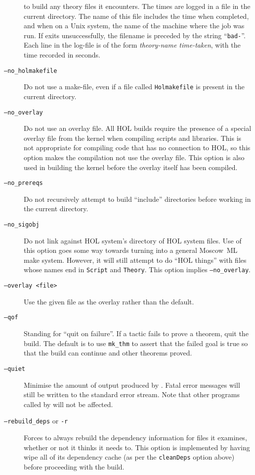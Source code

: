 \begin{description}
  to build any theory files it encounters.  The times are logged in a
  file in the current directory.  The name of this file includes the
  time when \holmake{} completed, and when on a Unix system, the name
  of the machine where the job was run.  If \holmake{} exits
  unsuccessfully, the filename is preceded by the string
  ``\texttt{bad-}''. Each line in the log-file is of the form
  \textit{theory-name time-taken}, with the time recorded in seconds.
\item[\texttt{--no\_holmakefile}]  Do not use a make-file, even if a file
  called \texttt{Holmakefile} is present in the current directory.
\item[\texttt{--no\_overlay}] Do not use an overlay file.  All HOL
  builds require the presence of a special overlay file from the
  kernel when compiling scripts and libraries.  This is not
  appropriate for compiling code that has no connection to HOL, so
  this option makes the compilation not use the overlay file.  This
  option is also used in building the kernel before the overlay itself
  has been compiled.
\item[\texttt{--no\_prereqs}] Do not recursively attempt to build
  ``include'' directories before working in the current directory.
\item[\texttt{--no\_sigobj}] Do not link against HOL system's
  directory of HOL system files.  Use of this option goes some way
  towards turning
  \holmake{} into a general Moscow~ML \textsf{make} system.  However,
  it will still attempt to do ``HOL things'' with files whose names
  end in \texttt{Script} and \texttt{Theory}.  This option implies
  \texttt{--no\_overlay}.
\item[\texttt{--overlay <file>}] Use the given file as the overlay
  rather than the default.
\item[\texttt{--qof}] Standing for ``quit on failure''.  If a tactic
  fails to prove a theorem, quit the build.  The default is to use
  \texttt{mk\_thm} to assert that the failed goal is true so that the
  build can continue and other theorems proved.
\item[\texttt{--quiet}] Minimise the amount of output produced by
  \holmake{}.  Fatal error messages will still be written to the
  standard error stream.  Note that other programs called by \holmake{} will not
  be affected.
\item[{\tt --rebuild\_deps} or {\tt -r}] Forces \holmake{} to always
  rebuild the dependency information for files it examines, whether or
  not it thinks it needs to.  This option is implemented by having
  \holmake{} wipe all of its dependency cache (as per the
  \texttt{cleanDeps} option above) before proceeding with the build.
\end{description}

